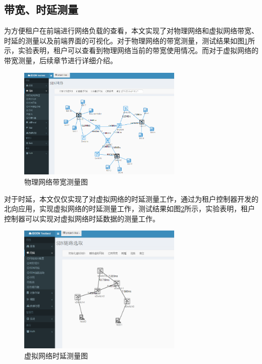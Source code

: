 \subsection{带宽、时延测量}
为方便租户在前端进行网络负载的查看，本文实现了对物理网络和虚拟网络带宽、时延的测量以及前端界面的可视化。对于物理网络的带宽测量，测试结果如图\ref{fig:bandwidth}所示，实验表明，租户可以查看到物理网络当前的带宽使用情况。而对于虚拟网络的带宽测量，后续章节进行详细介绍。

\begin{figure}[!htb]
  \centering
  \includegraphics[width=0.7\textwidth,height=0.50\textwidth]{logo/bandwidth.png}
  \caption{物理网络带宽测量图}
  \label{fig:bandwidth}
\end{figure}

对于时延，本文仅仅实现了对虚拟网络的时延测量工作，通过为租户控制器开发的北向应用，实现虚拟网络的时延测量工作，测试结果如图\ref{fig:virtualdelay}所示，实验表明，租户控制器可以实现对虚拟网络时延数据的测量工作。

\begin{figure}[!htb]
  \centering
  \includegraphics[width=0.7\textwidth,height=0.50\textwidth]{logo/virtualdelay.png}
  \caption{虚拟网络时延测量图}
  \label{fig:virtualdelay}
\end{figure}
